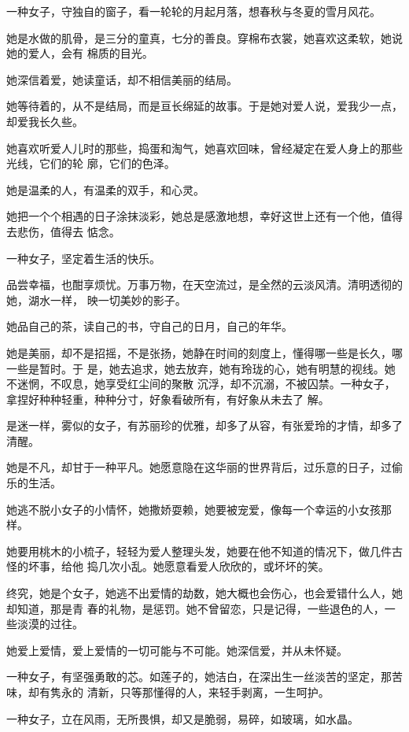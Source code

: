 \documentclass[12pt,a4paper]{article}
\begin{document}
		一种女子，守独自的窗子，看一轮轮的月起月落，想春秋与冬夏的雪月风花。

		她是水做的肌骨，是三分的童真，七分的善良。穿棉布衣裳，她喜欢这柔软，她说她的爱人，会有
	棉质的目光。


		她深信着爱，她读童话，却不相信美丽的结局。

		她等待着的，从不是结局，而是亘长绵延的故事。于是她对爱人说，爱我少一点，却爱我长久些。

		她喜欢听爱人儿时的那些，捣蛋和淘气，她喜欢回味，曾经凝定在爱人身上的那些光线，它们的轮
	廓，它们的色泽。

		她是温柔的人，有温柔的双手，和心灵。

		她把一个个相遇的日子涂抹淡彩，她总是感激地想，幸好这世上还有一个他，值得去悲伤，值得去
	惦念。


		一种女子，坚定着生活的快乐。

		品尝幸福，也酣享烦忧。万事万物，在天空流过，是全然的云淡风清。清明透彻的她，湖水一样，
	映一切美妙的影子。

		她品自己的茶，读自己的书，守自己的日月，自己的年华。

		她是美丽，却不是招摇，不是张扬，她静在时间的刻度上，懂得哪一些是长久，哪一些是暂时。于
	是，她去追求，她去放弃，她有玲珑的心，她有明慧的视线。她不迷惘，不叹息，她享受红尘间的聚散
	沉浮，却不沉溺，不被囚禁。一种女子，拿捏好种种轻重，种种分寸，好象看破所有，有好象从未去了
	解。

		是迷一样，雾似的女子，有苏丽珍的优雅，却多了从容，有张爱玲的才情，却多了清醒。


		她是不凡，却甘于一种平凡。她愿意隐在这华丽的世界背后，过乐意的日子，过偷乐的生活。

		她逃不脱小女子的小情怀，她撒娇耍赖，她要被宠爱，像每一个幸运的小女孩那样。

		她要用桃木的小梳子，轻轻为爱人整理头发，她要在他不知道的情况下，做几件古怪的坏事，给他
	捣几次小乱。她愿意看爱人欣欣的，或坏坏的笑。

		终究，她是个女子，她逃不出爱情的劫数，她大概也会伤心，也会爱错什么人，她却知道，那是青
	春的礼物，是惩罚。她不曾留恋，只是记得，一些退色的人，一些淡漠的过往。

		她爱上爱情，爱上爱情的一切可能与不可能。她深信爱，并从未怀疑。


		一种女子，有坚强勇敢的芯。如莲子的，她洁白，在深出生一丝淡苦的坚定，那苦味，却有隽永的
	清新，只等那懂得的人，来轻手剥离，一生呵护。

		一种女子，立在风雨，无所畏惧，却又是脆弱，易碎，如玻璃，如水晶。
\end{document}
